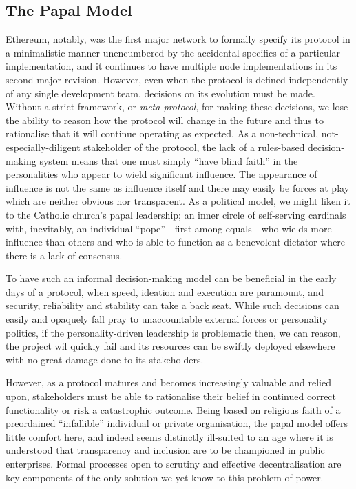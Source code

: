 \documentclass[9pt,oneside]{amsart}
\begin{document}
\subsection{The Papal Model}

Ethereum, notably, was the first major network to formally specify its protocol\cite{wood2014yellow} in a minimalistic manner unencumbered by the accidental specifics of a particular implementation, and it continues to have multiple node implementations in its second major revision. However, even when the protocol is defined independently of any single development team, decisions on its evolution must be made. Without a strict framework, or \emph{meta-protocol}, for making these decisions, we lose the ability to reason how the protocol will change in the future and thus to rationalise that it will continue operating as expected. As a non-technical, not-especially-diligent stakeholder of the protocol, the lack of a rules-based decision-making system means that one must simply ``have blind faith'' in the personalities who appear to wield significant influence. The appearance of influence is not the same as influence itself and there may easily be forces at play which are neither obvious nor transparent. As a political model, we might liken it to the Catholic church's papal leadership; an inner circle of self-serving cardinals with, inevitably, an individual ``pope''---first among equals---who wields more influence than others and who is able to function as a benevolent dictator where there is a lack of consensus.

To have such an informal decision-making model can be beneficial in the early days of a protocol, when speed, ideation and execution are paramount, and security, reliability and stability can take a back seat. While such decisions can easily and opaquely fall pray to unaccountable external forces or personality politics, if the personality-driven leadership is problematic then, we can reason, the project wil quickly fail and its resources can be swiftly deployed elsewhere with no great damage done to its stakeholders.

However, as a protocol matures and becomes increasingly valuable and relied upon, stakeholders must be able to rationalise their belief in continued correct functionality or risk a catastrophic outcome. Being based on religious faith of a preordained ``infallible'' individual or private organisation, the papal model offers little comfort here, and indeed seems distinctly ill-suited to an age where it is understood that transparency and inclusion are to be championed in public enterprises. Formal processes open to scrutiny and effective decentralisation are key components of the only solution we yet know to this problem of power.
\end{document}
